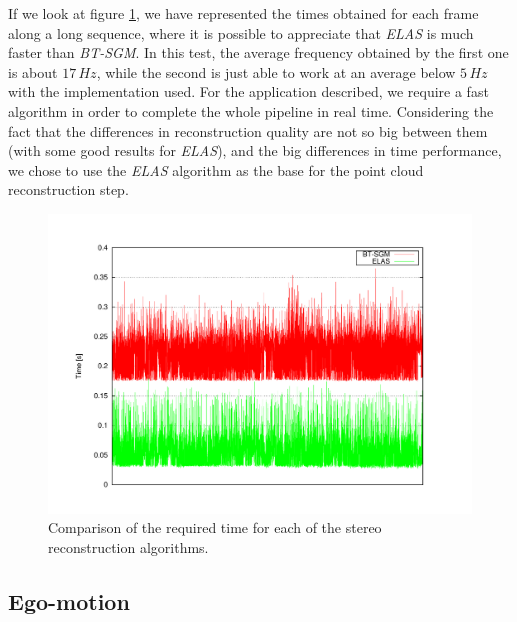 If we look at figure \ref{fig:cp05_times_elas_btsgm}, we have represented the times obtained for each frame along a long sequence, where it is possible to appreciate that \emph{ELAS} is much faster than \emph{BT-SGM}. In this test, the average frequency obtained by the first one is about $17\,Hz$, while the second is just able to work at an average below $5\,Hz$ with the implementation used. For the application described, we require a fast algorithm in order to complete the whole pipeline in real time. Considering the fact that the differences in reconstruction quality are not so big between them (with some good results for \emph{ELAS}), and the big differences in time performance, we chose to use the \emph{ELAS} algorithm as the base for the point cloud reconstruction step.

 \begin{figure}[t]
  \centering
  \includegraphics[width=\textwidth,height=0.5\textwidth, trim=50 50 90 60, clip]{timesELAS_OPENCV}
  \caption{Comparison of the required time for each of the stereo reconstruction algorithms.}\label{fig:cp05_times_elas_btsgm}
\end{figure}

\subsection{Ego-motion}\label{ch:chapter05_02_02}

